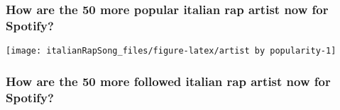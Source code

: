 \documentclass[
]{article}
\newenvironment{Shaded}{\begin{snugshade}}{\end{snugshade}}
\newcommand{\AttributeTok}[1]{\textcolor[rgb]{0.77,0.63,0.00}{#1}}
\newcommand{\CommentTok}[1]{\textcolor[rgb]{0.56,0.35,0.01}{\textit{#1}}}
\newcommand{\DecValTok}[1]{\textcolor[rgb]{0.00,0.00,0.81}{#1}}
\newcommand{\FunctionTok}[1]{\textcolor[rgb]{0.00,0.00,0.00}{#1}}
\newcommand{\NormalTok}[1]{#1}
\newcommand{\OtherTok}[1]{\textcolor[rgb]{0.56,0.35,0.01}{#1}}
\newcommand{\SpecialCharTok}[1]{\textcolor[rgb]{0.00,0.00,0.00}{#1}}
\newcommand{\StringTok}[1]{\textcolor[rgb]{0.31,0.60,0.02}{#1}}
\begin{document}
\hypertarget{how-are-the-50-more-popular-italian-rap-artist-now-for-spotify}{%
\subsubsection{How are the 50 more popular italian rap artist now for
Spotify?}\label{how-are-the-50-more-popular-italian-rap-artist-now-for-spotify}}

\begin{Shaded}
\end{Shaded}

\begin{center}\texttt{[image: italianRapSong\_files/figure-latex/artist by popularity-1]} \end{center}

\hypertarget{how-are-the-50-more-followed-italian-rap-artist-now-for-spotify}{%
\subsubsection{How are the 50 more followed italian rap artist now for
Spotify?}\label{how-are-the-50-more-followed-italian-rap-artist-now-for-spotify}}
\end{document}
